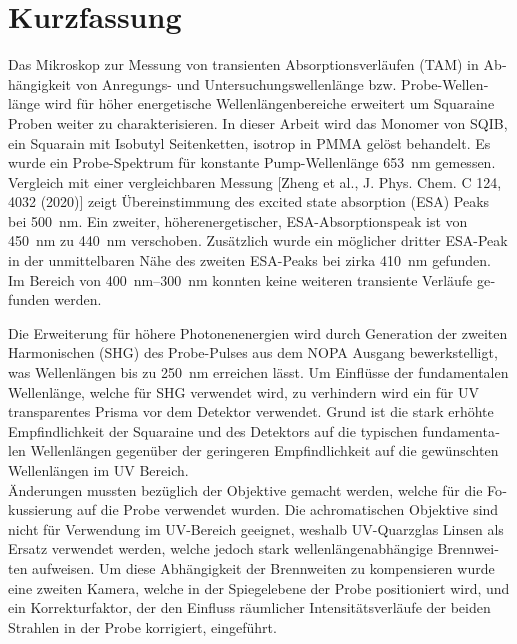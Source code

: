\documentclass[twoside,openright,listof=numbered]{scrreprt}
\begin{document}
\chapter*{Kurzfassung}
\begin{otherlanguage}{german}
Das Mikroskop zur Messung von transienten Absorptionsverläufen (TAM) in Abhängigkeit von Anregungs- und Untersuchungswellenlänge bzw. Probe-Wellenlänge wird für höher energetische Wellenlängenbereiche erweitert um Squaraine Proben weiter zu charakterisieren. In dieser Arbeit wird das Monomer von SQIB, ein Squarain mit Isobutyl Seitenketten, isotrop in PMMA gelöst behandelt. Es wurde ein Probe-Spektrum für konstante Pump-Wellenlänge \qty{653}{\nano\meter} gemessen. Vergleich mit einer vergleichbaren Messung [Zheng et al., J. Phys. Chem. C 124, 4032 (2020)] zeigt Übereinstimmung des excited state absorption (ESA) Peaks bei \qty{500}{\nano\meter}. Ein zweiter, höherenergetischer, ESA-Absorptionspeak ist von \qty{450}{\nano\meter} zu \qty{440}{\nano\meter} verschoben. Zusätzlich wurde ein möglicher dritter ESA-Peak in der unmittelbaren Nähe des zweiten ESA-Peaks bei zirka \qty{410}{\nano\meter} gefunden. Im Bereich von \qtyrange{400}{300}{\nano\meter} konnten keine weiteren transiente Verläufe gefunden werden.


Die Erweiterung für höhere Photonenenergien wird durch Generation der zweiten Harmonischen (SHG) des Probe-Pulses aus dem NOPA Ausgang bewerkstelligt, was Wellenlängen bis zu \qty{250}{\nano\meter} erreichen lässt. Um Einflüsse der fundamentalen Wellenlänge, welche für SHG verwendet wird, zu verhindern wird ein für UV transparentes Prisma vor dem Detektor verwendet. Grund ist die stark erhöhte Empfindlichkeit der Squaraine und des Detektors auf die typischen fundamentalen Wellenlängen gegenüber der geringeren Empfindlichkeit auf die gewünschten Wellenlängen im UV Bereich.\\
Änderungen mussten bezüglich der Objektive gemacht werden, welche für die Fokussierung auf die Probe verwendet wurden. Die achromatischen Objektive sind nicht für Verwendung im UV-Bereich geeignet, weshalb UV-Quarzglas Linsen als Ersatz verwendet werden, welche jedoch stark wellenlängenabhängige Brennweiten aufweisen. Um diese Abhängigkeit der Brennweiten zu kompensieren wurde eine zweiten Kamera, welche in der Spiegelebene der Probe positioniert wird, und ein Korrekturfaktor, der den Einfluss räumlicher Intensitätsverläufe der beiden Strahlen in der Probe korrigiert, eingeführt.
\end{otherlanguage}
\end{document}
